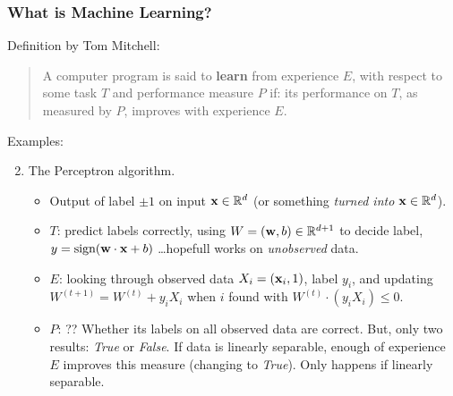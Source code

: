 \documentclass{beamer}
\theoremstyle{example}
\begin{document}
\begin{frame}
\frametitle{What is Machine Learning?}
    Definition by Tom Mitchell:\newline 
    \begin{quote}
        A computer program is said to \textbf{learn} from experience $E$, with respect to some task $T$ and performance measure $P$ if: its performance on $T$, as measured by $P$, improves with experience $E$.
    \end{quote}
    
    {\color{mygreen}Examples:}
    \begin{enumerate}
        \setcounter{enumi}{1}
        \item The Perceptron algorithm.
        \begin{itemize}
            \item Output of label $\pm 1$ on input ${\bf x}\in \mathbb R^d$ (or something \textit{turned into} ${\bf x}\in\mathbb R^d$).
            \item $T$: predict labels correctly, using $W = ({\bf w}, b)\in\mathbb R^{d+1}$ to decide label, $y = \textrm{sign}({\bf w}\cdot{\bf x} + b)$ \newline 
            \ldots hopefull works on \textit{unobserved} data.
            \item $E$: looking through observed data $X_i = ({\bf x}_i,1)$, label $y_i$, and updating $W^{(t+1)} = W^{(t)} + y_iX_i$ when $i$ found with $W^{(t)}\cdot(y_iX_i)\le 0$.
            \item $P$: ?? \newline 
                    Whether its labels on all observed data are correct. But, only two results: \textit{True} or \textit{False}. \newline 
                    If data is linearly separable, enough of experience $E$ improves this measure (changing to \textit{True}). Only happens if linearly separable.
        \end{itemize}
    \end{enumerate}

\end{frame}
\end{document}
